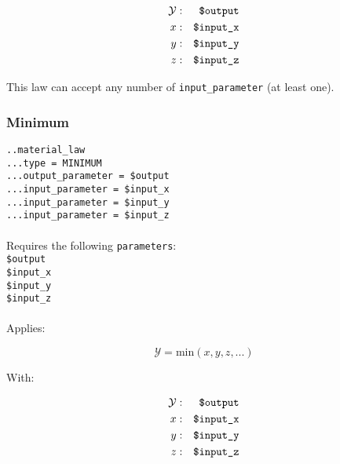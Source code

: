 \documentclass[10pt]{article}
\begin{document}
\begin{eqnarray}
	\mathcal{Y} & : & \verb+$output+ \notag \\
	x & : & \verb+$input_x+ \notag \\
	y & : & \verb+$input_y+ \notag \\
	z & : & \verb+$input_z+ \notag 
\end{eqnarray}

This law can accept any number of \verb+input_parameter+ (at least one).

\subsubsection{Minimum}

\noindent \verb+..material_law+\\
\verb+...type = MINIMUM+\\
\verb+...output_parameter = $output+\\
\verb+...input_parameter = $input_x+\\
\verb+...input_parameter = $input_y+\\
\verb+...input_parameter = $input_z+

\paragraph{}Requires the following \verb+parameters+:\\

\noindent \verb+$output+\\
\verb+$input_x+\\
\verb+$input_y+\\
\verb+$input_z+

\paragraph{}Applies:

\begin{equation}
	\mathcal{Y} = \mathrm{min}( x,y,z,... )
\end{equation}

With:

\begin{eqnarray}
	\mathcal{Y} & : & \verb+$output+ \notag \\
	x & : & \verb+$input_x+ \notag \\
	y & : & \verb+$input_y+ \notag \\
	z & : & \verb+$input_z+ \notag 
\end{eqnarray}
\end{document}
